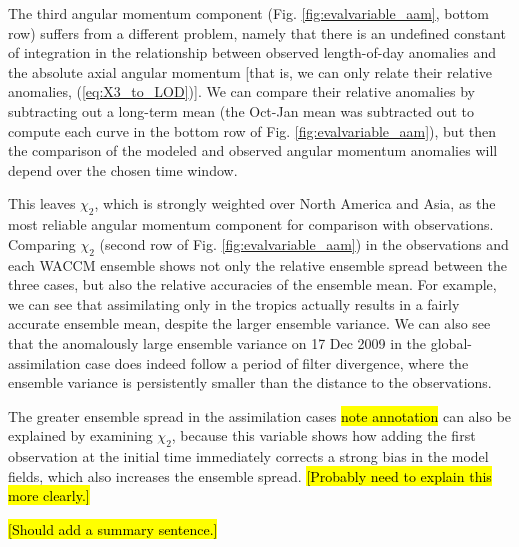 The third angular momentum component (Fig. \ref{fig:evalvariable_aam}, bottom row)
suffers from a different problem, namely that there is an undefined constant of integration in the relationship between observed length-of-day anomalies and the absolute axial angular momentum [that is, we can only relate their relative anomalies, (\ref{eq:X3_to_LOD})].
We can compare their relative anomalies by subtracting out a long-term mean (the Oct-Jan mean was subtracted out to compute each curve in the bottom row of Fig. \ref{fig:evalvariable_aam}), but then the comparison of the modeled and observed angular momentum anomalies will depend over the chosen time window. 

This leaves $\chi_2$, which is strongly weighted over North America and Asia, as the most reliable angular momentum component for comparison with observations. 
Comparing $\chi_2$ (second row of Fig. \ref{fig:evalvariable_aam}) in the observations and each WACCM ensemble shows not only the relative ensemble spread between the three cases, but also the relative accuracies of the ensemble mean. 
For example, we can see that assimilating only in the tropics actually results in a fairly accurate ensemble mean, despite the larger ensemble variance. 
We can also see that the anomalously large ensemble variance on 17 Dec 2009 in the global-assimilation case does indeed follow a period of filter divergence, where the ensemble variance is persistently smaller than the distance to the observations. 

The greater ensemble spread in the assimilation cases \hl{note annotation} can also be explained by examining $\chi_2$, because this variable shows how adding the first observation at the initial time immediately corrects 
a strong bias in the model fields, which also increases the ensemble spread. 
\hl{[Probably need to explain this more clearly.]}  

\hl{[Should add a summary sentence.]}
